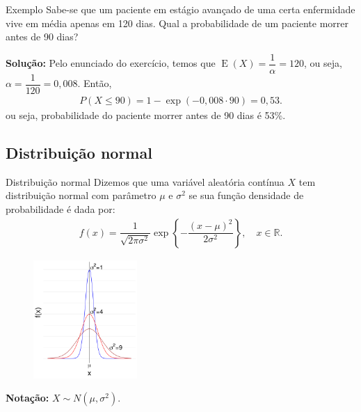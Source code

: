 \documentclass[9pt]{beamer}
\DeclareMathOperator{\espe}{E}
\begin{document}
\begin{frame}{Exemplo}
  Sabe-se que um paciente em estágio avançado de uma certa enfermidade vive em média apenas em 120 dias. Qual a probabilidade de um paciente morrer antes de 90 dias?
  \vfill
 
 \textbf{Solução:}
 Pelo enunciado do exercício, temos que $\espe(X) = \dfrac{1}{\alpha} =  120$, ou seja, $\alpha = \dfrac{1}{120} = 0,008$. Então,
 \begin{align*}
  P(X \leq 90) = 1 - \exp (-0,008 \cdot 90) = 0,53.
 \end{align*}
  ou seja,  probabilidade do paciente morrer antes de 90 dias é 53\%.
\end{frame}

\subsection{Distribuição normal}

\begin{frame}{Distribuição normal}
Dizemos que uma variável aleatória contínua $X$ tem distribuição normal com parâmetro $\mu$ e $\sigma^2$ se sua função densidade de probabilidade é dada por:
\begin{align*}
 f(x) = \dfrac{1}{\sqrt{2 \pi \sigma^2}} \exp \left\{ -\dfrac{(x-\mu)^2}{2\sigma^2}  \right\}, \quad x \in \mathbb{R}.
\end{align*}

\begin{figure}[ht]
 \centering
 \caption{}
 \includegraphics[height = 4.5cm]{figure/normal.png}
\end{figure}


\textbf{Notação:} $X \sim N(\mu, \sigma^2)$.

\end{frame}
\end{document}
